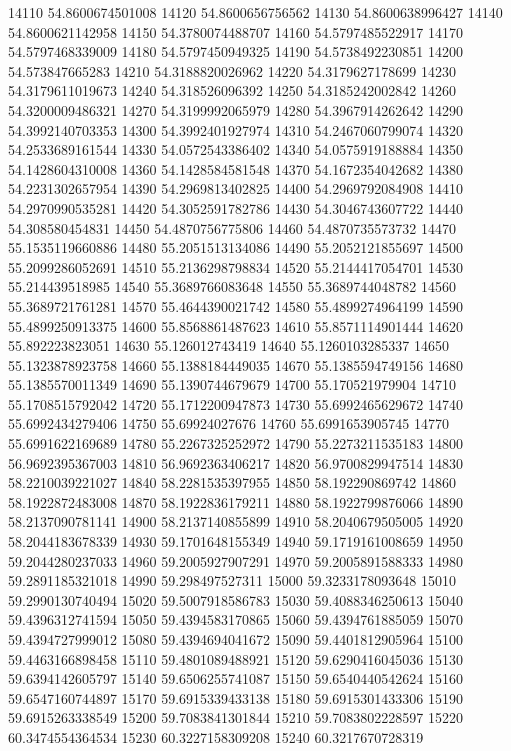 {14110 54.8600674501008
14120 54.8600656756562
14130 54.8600638996427
14140 54.8600621142958
14150 54.3780074488707
14160 54.5797485522917
14170 54.5797468339009
14180 54.5797450949325
14190 54.5738492230851
14200 54.573847665283
14210 54.3188820026962
14220 54.3179627178699
14230 54.3179611019673
14240 54.318526096392
14250 54.3185242002842
14260 54.3200009486321
14270 54.3199992065979
14280 54.3967914262642
14290 54.3992140703353
14300 54.3992401927974
14310 54.2467060799074
14320 54.2533689161544
14330 54.0572543386402
14340 54.0575919188884
14350 54.1428604310008
14360 54.1428584581548
14370 54.1672354042682
14380 54.2231302657954
14390 54.2969813402825
14400 54.2969792084908
14410 54.2970990535281
14420 54.3052591782786
14430 54.3046743607722
14440 54.308580454831
14450 54.4870756775806
14460 54.4870735573732
14470 55.1535119660886
14480 55.2051513134086
14490 55.2052121855697
14500 55.2099286052691
14510 55.2136298798834
14520 55.2144417054701
14530 55.214439518985
14540 55.3689766083648
14550 55.3689744048782
14560 55.3689721761281
14570 55.4644390021742
14580 55.4899274964199
14590 55.4899250913375
14600 55.8568861487623
14610 55.8571114901444
14620 55.892223823051
14630 55.126012743419
14640 55.1260103285337
14650 55.1323878923758
14660 55.1388184449035
14670 55.1385594749156
14680 55.1385570011349
14690 55.1390744679679
14700 55.170521979904
14710 55.1708515792042
14720 55.1712200947873
14730 55.6992465629672
14740 55.6992434279406
14750 55.69924027676
14760 55.6991653905745
14770 55.6991622169689
14780 55.2267325252972
14790 55.2273211535183
14800 56.9692395367003
14810 56.9692363406217
14820 56.9700829947514
14830 58.2210039221027
14840 58.2281535397955
14850 58.192290869742
14860 58.1922872483008
14870 58.1922836179211
14880 58.1922799876066
14890 58.2137090781141
14900 58.2137140855899
14910 58.2040679505005
14920 58.2044183678339
14930 59.1701648155349
14940 59.1719161008659
14950 59.2044280237033
14960 59.2005927907291
14970 59.2005891588333
14980 59.2891185321018
14990 59.298497527311
15000 59.3233178093648
15010 59.2990130740494
15020 59.5007918586783
15030 59.4088346250613
15040 59.4396312741594
15050 59.4394583170865
15060 59.4394761885059
15070 59.4394727999012
15080 59.4394694041672
15090 59.4401812905964
15100 59.4463166898458
15110 59.4801089488921
15120 59.6290416045036
15130 59.6394142605797
15140 59.6506255741087
15150 59.6540440542624
15160 59.6547160744897
15170 59.6915339433138
15180 59.6915301433306
15190 59.6915263338549
15200 59.7083841301844
15210 59.7083802228597
15220 60.3474554364534
15230 60.3227158309208
15240 60.3217670728319
}
